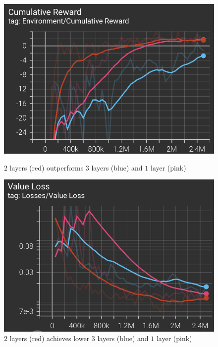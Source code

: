\begin{figure}
\centering
\begin{multicols}{2}
\includegraphics[width=0.99\columnwidth]{Chapter3/HU/layers_cum_reward.png}\par
\caption{ $2$ layers (red) outperforms $3$ layers (blue) and $1$ layer (pink)}
\label{fig:la_cumreward}

\includegraphics[width=0.99\columnwidth]{Chapter3/HU/layers_loss.png}\par
\caption{
$2$ layers (red) achieves lower $3$ layers (blue) and $1$ layer (pink)
}
\label{fig:la_loss}
\end{multicols}
\end{figure}
